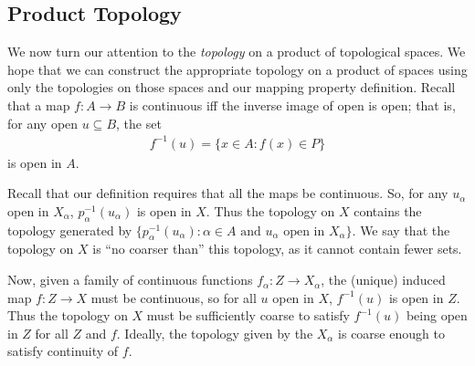       \subsection{Product Topology}
        We now turn our attention to the \emph{topology} on a product of topological spaces.
        We hope that we can construct the appropriate topology on a product of spaces using only the topologies on those spaces and our mapping property definition.
        Recall that a map $f:A\rightarrow B$ is continuous iff the inverse image of open is open; that is, for any open $u\subseteq B$, the set
        \begin{align*}
          f^{-1}(u) = \{x\in A:f(x)\in P\}
        \end{align*}
        is open in $A$.

        Recall that our definition requires that all the maps be continuous.
        So, for any $u_\alpha$ open in $X_\alpha$, $p_\alpha^{-1}(u_\alpha)$ is open in $X$.
        Thus the topology on $X$ contains the topology generated by $\{p_\alpha^{-1}(u_\alpha):\alpha\in A\text{ and } u_\alpha\text{ open in }X_\alpha\}$.
        We say that the topology on $X$ is ``no coarser than'' this topology, as it cannot contain fewer sets.
        
        Now, given a family of continuous functions $f_\alpha:Z\rightarrow X_\alpha$, the (unique) induced map $f:Z\rightarrow X$ must be continuous, so for all $u$ open in $X$, $f^{-1}(u)$ is open in $Z$.
        Thus the topology on $X$ must be sufficiently coarse to satisfy $f^{-1}(u)$ being open in $Z$ for all $Z$ and $f$.
        Ideally, the topology given by the $X_\alpha$ is coarse enough to satisfy continuity of $f$.

